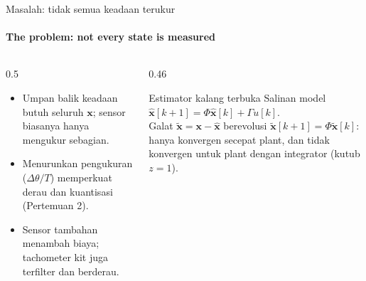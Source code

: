 \documentclass[aspectratio=169,10pt]{beamer}
\begin{document}
\begin{frame}{Masalah: tidak semua keadaan terukur}
	\framesubtitle{The problem: not every state is measured}
	\begin{columns}[T]
		\begin{column}{0.5\textwidth}
			\begin{itemize}
				\item Umpan balik keadaan butuh seluruh $\mathbf{x}$; sensor biasanya hanya mengukur sebagian.
				\item Menurunkan pengukuran ($\Delta\theta/T$) memperkuat derau dan kuantisasi (Pertemuan 2).
				\item Sensor tambahan menambah biaya; tachometer kit juga terfilter dan berderau.
			\end{itemize}
		\end{column}
		\begin{column}{0.46\textwidth}
			\begin{alertblock}{Estimator kalang terbuka}
				\small
				Salinan model $\hat{\mathbf{x}}[k+1] = \Phi\hat{\mathbf{x}}[k] + \Gamma u[k]$.\\[3pt]
				Galat $\tilde{\mathbf{x}} = \mathbf{x} - \hat{\mathbf{x}}$ berevolusi $\tilde{\mathbf{x}}[k+1] = \Phi\tilde{\mathbf{x}}[k]$: hanya konvergen secepat plant, dan \alert{tidak konvergen} untuk plant dengan integrator (kutub $z=1$).
			\end{alertblock}
		\end{column}
	\end{columns}
\end{frame}
\end{document}
